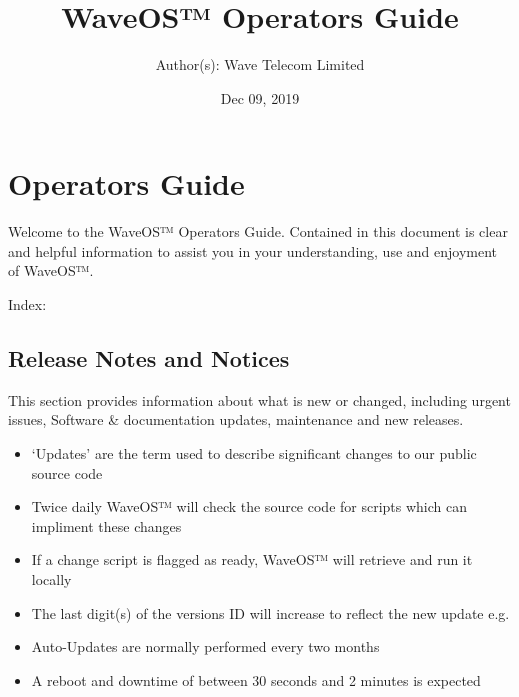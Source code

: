 \documentclass[letterpaper,10pt,openany,oneside,english]{sphinxmanual}
\title{WaveOS™ Operators Guide}
\date{Dec 09, 2019}
\author{Author(s): Wave Telecom Limited}
\begin{document}
\maketitle
\sphinxtableofcontents
{}\label{\detokenize{index::doc}}



\chapter{Operators Guide}
\label{\detokenize{index:operators-guide}}
Welcome to the WaveOS™ Operators Guide. Contained in this document is clear and helpful information to assist you in your understanding, use and enjoyment of WaveOS™.

Index:


\section{Release Notes and Notices}
\label{\detokenize{releasenotes:release-notes-and-notices}}\label{\detokenize{releasenotes::doc}}
This section provides information about what is new or changed, including urgent issues, Software \& documentation updates, maintenance and new releases.
\begin{itemize}
\item {} 
‘Updates’ are the term used to describe significant changes to our public source code

\item {} 
Twice daily WaveOS™ will check the source code for scripts which can impliment these changes

\item {} 
If a change script is flagged as ready, WaveOS™ will retrieve and run it locally

\item {} 
The last digit(s) of the versions ID will increase to reflect the new update e.g. 

\item {} 
Auto-Updates are normally performed every two months

\item {} 
A reboot and downtime of between 30 seconds and 2 minutes is expected

\end{itemize}
\end{document}
